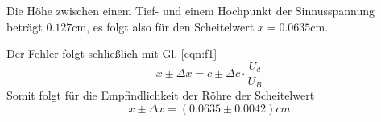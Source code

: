 Die Höhe zwischen einem Tief- und einem Hochpunkt der Sinnusspannung beträgt $0.127$cm,
es folgt also für den Scheitelwert $x=0.0635$cm.

Der Fehler folgt schließlich mit Gl. \ref{eqn:f1}
\begin{equation*}
    x \pm  \Delta x = c \pm \Delta c \cdot \frac{U_d}{U_B}
\end{equation*}
Somit folgt für die Empfindlichkeit der Röhre der Scheitelwert
\begin{equation}
    x \pm \Delta x=(0.0635\pm 0.0042)cm
\end{equation}

